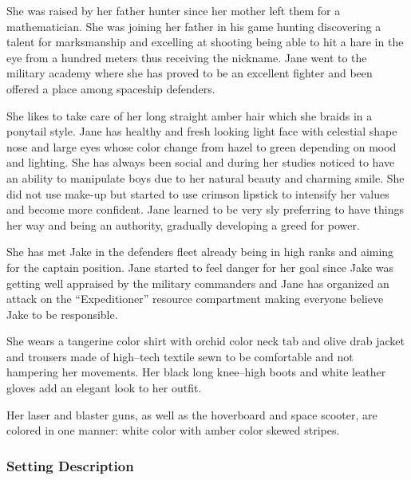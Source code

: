 \documentclass{article}
\begin{document}
She was raised by her father hunter since her mother left them for a
mathematician. She was joining her father in his game hunting discovering a
talent for marksmanship and excelling at shooting being able to hit a hare in
the eye from a hundred meters thus receiving the nickname. Jane went to the
military academy where she has proved to be an excellent fighter and been
offered a place among spaceship defenders.

She likes to take care of her long straight amber hair which she braids in a
ponytail style. Jane has healthy and fresh looking light face with celestial
shape nose and large eyes whose color change from hazel to green depending on
mood and lighting. She has always been social and during her studies noticed to
have an ability to manipulate boys due to her natural beauty and charming smile.
She did not use make-up but started to use crimson lipstick to intensify her
values and become more confident. Jane learned to be very sly preferring to have
things her way and being an authority, gradually developing a greed for power.

She has met Jake in the defenders fleet already being in high ranks and aiming
for the captain position. Jane started to feel danger for her goal since Jake
was getting well appraised by the military commanders and Jane has organized an
attack on the ``Expeditioner'' resource compartment making everyone believe Jake
to be responsible.

She wears a tangerine color shirt with orchid color neck tab and olive drab
jacket and trousers made of high--tech textile sewn to be comfortable and not
hampering her movements. Her black long knee--high boots and white leather
gloves add an elegant look to her outfit.

Her laser and blaster guns, as well as the hoverboard and space scooter, are
colored in one manner: white color with amber color skewed stripes.

\subsubsection*{Setting Description}
\end{document}
